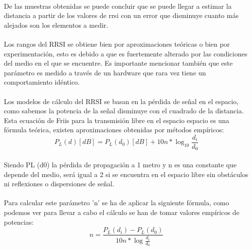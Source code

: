 \documentclass[a4paper ,12pt, onecolumn]{article}
\begin{document}
                \paragraph{}
                De las muestras obtenidas se puede concluir que se puede llegar a estimar la distancia a partir de los valores
                de rrsi con un error que disminuye cuanto más alejados son los elementos a medir. 
                \paragraph{}
                Los rangos del RRSI se obtiene bien por aproximaciones teóricas o bien por experimentación, esto es debido a que 
                es fuertemente alterado por las condiciones del medio en el que se encuentre. Es importante mencionar también que
                este parámetro es medido a través de un hardware que rara vez tiene un comportamiento idéntico.
                \paragraph{}
                Los modelos de cálculo del RRSI se basan en la pérdida de señal en el espacio, como sabemos la potencia de la señal
                disminuye con el cuadrado de la distancia. Esta ecuación de Friis para la transmisión libre en el espacio espacio es 
                una fórmula teórica, existen aproximaciones obtenidas por métodos empíricos:
                \begin{equation}
                    P_L(d) [dB] = P_L(d_0) [dB] + 10n *\log_{10} \frac{ d_i }{d_0} 
                \end{equation}
                \paragraph{}
                Siendo PL (d0)  la pérdida de propagación a 1 metro y n es una constante que depende del medio, será igual
                a 2 si se encuentra en el espacio libre sin obstáculos ni reflexiones o dispersiones de señal.
                \paragraph{}
                Para calcular este parámetro 'n' se ha de aplicar la siguiente fórmula, como podemos ver para llevar a cabo el 
                cálculo se han de tomar valores empíricos de potencias:
                \begin{equation}
                    n = \frac{ P_L(d_i) - P_L(d_0) }{10n*\log_{}\frac{d_i}{d_0}}
                \end{equation}
\end{document}
